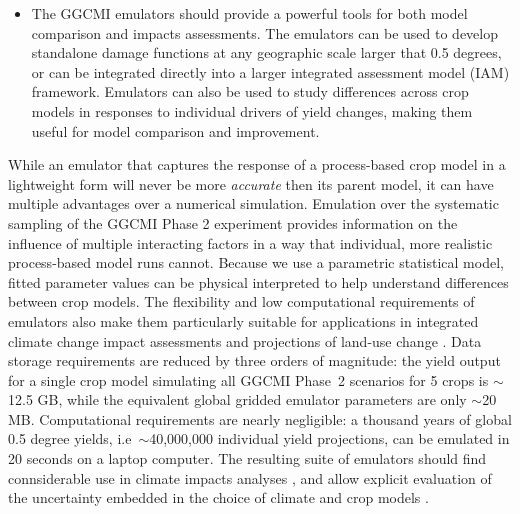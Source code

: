 \documentclass[gmdd]{copernicus} %
\begin{document}
\begin{itemize}
	\item The GGCMI emulators should provide a powerful tools for both model comparison and impacts assessments. The emulators can be used to develop standalone damage functions at any geographic scale larger that 0.5 degrees, or can be integrated directly into a larger integrated assessment model (IAM) framework. Emulators can also be used to study differences across crop models in responses to individual drivers of yield changes, making them useful for model comparison and improvement.


\end{itemize}

 
While an emulator that captures the response of a process-based crop model in a lightweight form  will never be more \textit{accurate} then its parent model, it can have multiple advantages over a numerical simulation. 
Emulation over the systematic sampling of the GGCMI Phase 2 experiment provides information on the influence of multiple interacting factors in a way that individual, more realistic process-based model runs cannot. 
Because we use a parametric statistical model, fitted parameter values can be physical interpreted to help understand differences between crop models. 
The flexibility and low computational requirements of emulators also make them particularly suitable for applications in integrated climate change impact assessments and projections of land-use change \citep[e.g.][]{nelson2014}.
Data storage requirements are reduced by three orders of magnitude: the yield output for a single crop model simulating all GGCMI Phase~2 scenarios for 5 crops is $\sim$12.5 GB, while the equivalent global gridded emulator parameters are only $\sim$20 MB. 
Computational requirements are nearly negligible: a thousand years of global 0.5 degree yields, i.e\ $\sim$40,000,000 individual yield projections, can be emulated in 20 seconds on a laptop computer. The resulting suite of emulators should find connsiderable use in climate impacts analyses \citep[e.g.][]{Stevanovic2016}, and allow  
explicit evaluation of the uncertainty embedded in the choice of climate and crop models \citep{muller_global_2017}. 
\end{document}
